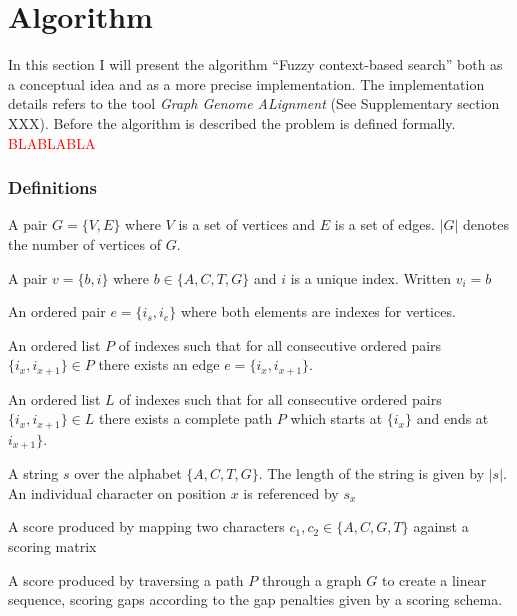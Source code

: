 \documentclass{article}
\begin{document}
\chapter{Algorithm}
In this section I will present the algorithm ``Fuzzy context-based search'' both as a conceptual idea and as a more precise implementation. The implementation details refers to the tool \textit{Graph Genome ALignment} (See Supplementary section XXX). Before the algorithm is described the problem is defined formally. \textcolor{red}{BLABLABLA}
\subsection{Definitions}
\begin{defn}
	A pair $G=\{V,E\}$ where $V$ is a set of vertices and $E$ is a set of edges. $|G|$ denotes the number of vertices of $G$.
\end{defn}
\begin{defn}[Vertice]
	A pair $v=\{b, i\}$ where $b \in \{A, C, T, G\}$ and $i$ is a unique index. Written $v_i=b$
\end{defn}
\begin{defn}[Edge]
	An ordered pair $e=\{i_s, i_e\}$ where both elements are indexes for vertices. 
\end{defn}
\begin{defn}
	An ordered list $P$ of indexes such that for all consecutive ordered pairs $\{i_x, i_{x+1}\} \in P$ there exists an edge $e=\{i_x, i_{x+1}\}$.
\end{defn}
\begin{defn}[Path]
	An ordered list $L$ of indexes such that for all consecutive ordered pairs $\{i_x, i_{x+1}\} \in L$ there exists a complete path $P$ which starts at $\{i_x\}$ and ends at $i_{x+1}\}$.
\end{defn}
\begin{defn}
	A string $s$ over the alphabet $\{A, C, T, G\}$. The length of the string is given by $|s|$. An individual character on position $x$ is referenced by $s_x$
\end{defn}
\begin{defn}
	A score produced by mapping two characters $c_1, c_2 \in \{A, C, G, T\}$ against a scoring matrix
\end{defn}
\begin{defn}
	A score produced by traversing a path $P$ through a graph $G$ to create a linear sequence, scoring gaps according to the gap penalties given by a scoring schema.
\end{defn}
\end{document}
